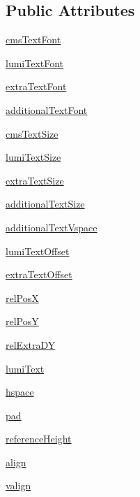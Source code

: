 \subsection*{Public Attributes}
\begin{DoxyCompactItemize}
\item 
\hyperlink{classrootplotlib_1_1CmsDecoration_adcf038d8d49be968e6dbec01b4d7dd73}{cms\-Text\-Font}
\item 
\hyperlink{classrootplotlib_1_1CmsDecoration_a27c60712cec34727c3ae234a792736cf}{lumi\-Text\-Font}
\item 
\hyperlink{classrootplotlib_1_1CmsDecoration_a06b1b3231febb73c4427df5f5aa2c103}{extra\-Text\-Font}
\item 
\hyperlink{classrootplotlib_1_1CmsDecoration_a991b5fdaa521831e6c65143d604f3b90}{additional\-Text\-Font}
\item 
\hyperlink{classrootplotlib_1_1CmsDecoration_a03873a16892dfc406f60f58e8a857439}{cms\-Text\-Size}
\item 
\hyperlink{classrootplotlib_1_1CmsDecoration_ae25079f8ff980748c27d63cfb2bae31d}{lumi\-Text\-Size}
\item 
\hyperlink{classrootplotlib_1_1CmsDecoration_a79ff2fe4b8b78c4d591e73c185f3359b}{extra\-Text\-Size}
\item 
\hyperlink{classrootplotlib_1_1CmsDecoration_acd9b2e955809d9bc42baa4d460c0e4f4}{additional\-Text\-Size}
\item 
\hyperlink{classrootplotlib_1_1CmsDecoration_afe72abd7f88497859eb55718db7f21ef}{additional\-Text\-Vspace}
\item 
\hyperlink{classrootplotlib_1_1CmsDecoration_a17869a82124ada178991b5fb34a38b96}{lumi\-Text\-Offset}
\item 
\hyperlink{classrootplotlib_1_1CmsDecoration_a9bb8addf79044eb1b50299c4d37f2c77}{extra\-Text\-Offset}
\item 
\hyperlink{classrootplotlib_1_1CmsDecoration_af30af7724698c8b0103ac45b6981b0e2}{rel\-Pos\-X}
\item 
\hyperlink{classrootplotlib_1_1CmsDecoration_a4d3ae76361a206d7bcbed674fb84ea74}{rel\-Pos\-Y}
\item 
\hyperlink{classrootplotlib_1_1CmsDecoration_ae5b21548bca8897a614c3baedcce70a6}{rel\-Extra\-D\-Y}
\item 
\hyperlink{classrootplotlib_1_1CmsDecoration_a2c4fa1b78057c799a0def68495a32ec1}{lumi\-Text}
\item 
\hyperlink{classrootplotlib_1_1CmsDecoration_a6db1aee0689f2b25b9b1262e453614e5}{hspace}
\item 
\hyperlink{classrootplotlib_1_1CmsDecoration_a49f368fc4ddf5bd4fa660706df97df94}{pad}
\item 
\hyperlink{classrootplotlib_1_1CmsDecoration_a8ad4d4e599e54ef01324f938f0198339}{reference\-Height}
\item 
\hyperlink{classrootplotlib_1_1CmsDecoration_a1f291532e91e7f64f3c9db21e8c17f01}{align}
\item 
\hyperlink{classrootplotlib_1_1CmsDecoration_a0015ddd82a36db72573e0aae56f26cbb}{valign}
\end{DoxyCompactItemize}



